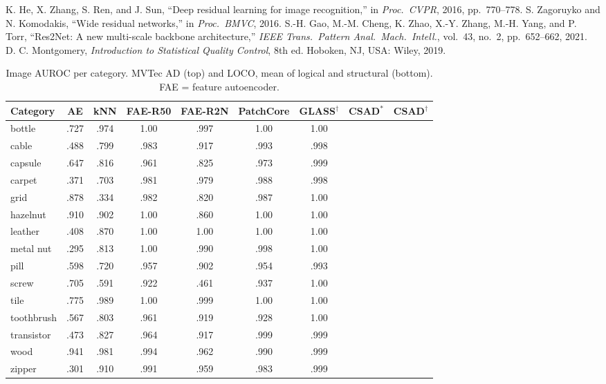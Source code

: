 \documentclass[conference]{IEEEtran}
\begin{document}
\begin{thebibliography}{00}
 K. He, X. Zhang, S. Ren, and J. Sun, ``Deep residual learning for image recognition,'' in \emph{Proc.\ CVPR}, 2016, pp.~770--778.
 S. Zagoruyko and N. Komodakis, ``Wide residual networks,'' in \emph{Proc.\ BMVC}, 2016.
 S.-H. Gao, M.-M. Cheng, K. Zhao, X.-Y. Zhang, M.-H. Yang, and P. Torr, ``Res2Net: A new multi-scale backbone architecture,'' \emph{IEEE Trans.\ Pattern Anal.\ Mach.\ Intell.}, vol.~43, no.~2, pp.~652--662, 2021.
 D. C. Montgomery, \emph{Introduction to Statistical Quality Control}, 8th ed. Hoboken, NJ, USA: Wiley, 2019.
\end{thebibliography}

\appendix
\begin{table}[h]
\caption{Image AUROC per category. MVTec AD (top) and LOCO, mean of logical and structural (bottom). FAE = feature
autoencoder.}
\label{tab:percat}
\centering\scriptsize
\setlength{\tabcolsep}{2.0pt}
\begin{tabular}{@{}lcccccccc@{}}
\toprule
Category & AE & kNN & FAE-R50 & FAE-R2N & PatchCore & GLASS$^\dagger$ & CSAD$^\ast$ & CSAD$^\dagger$ \\
\midrule
bottle & .727 & .974 & 1.00 & .997 & 1.00 & 1.00 & & \\
cable & .488 & .799 & .983 & .917 & .993 & .998 & & \\
capsule & .647 & .816 & .961 & .825 & .973 & .999 & & \\
carpet & .371 & .703 & .981 & .979 & .988 & .998 & & \\
grid & .878 & .334 & .982 & .820 & .987 & 1.00 & & \\
hazelnut & .910 & .902 & 1.00 & .860 & 1.00 & 1.00 & & \\
leather & .408 & .870 & 1.00 & 1.00 & 1.00 & 1.00 & & \\
metal nut & .295 & .813 & 1.00 & .990 & .998 & 1.00 & & \\
pill & .598 & .720 & .957 & .902 & .954 & .993 & & \\
screw & .705 & .591 & .922 & .461 & .937 & 1.00 & & \\
tile & .775 & .989 & 1.00 & .999 & 1.00 & 1.00 & & \\
toothbrush & .567 & .803 & .961 & .919 & .928 & 1.00 & & \\
transistor & .473 & .827 & .964 & .917 & .999 & .999 & & \\
wood & .941 & .981 & .994 & .962 & .990 & .999 & & \\
zipper & .301 & .910 & .991 & .959 & .983 & .999 & & \\

\end{tabular}
\end{table}
\end{document}
